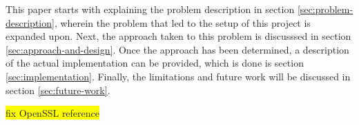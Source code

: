 \documentclass[twocolumn,english,compsoc,journal]{IEEEtran}
\newcommand{\todo}[1]{\colorbox{yellow}{#1}}
\begin{document}
This paper starts with explaining the problem description in section \ref{sec:problem-description}, wherein the problem that led to the setup of this project is expanded upon.
Next, the approach taken to this problem is discusssed in section \ref{sec:approach-and-design}.
Once the approach has been determined, a description of the actual implementation can be provided, which is done is section \ref{sec:implementation}.
Finally, the limitations and future work will be discussed in section \ref{sec:future-work}.









\todo{fix OpenSSL reference}



\end{document}

